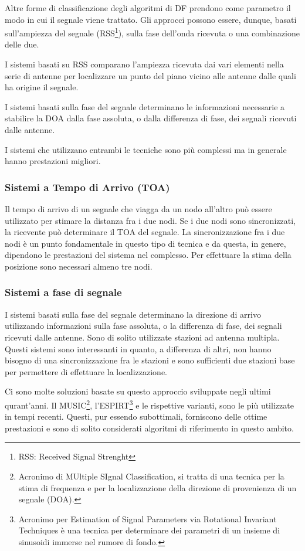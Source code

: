 Altre forme di classificazione degli algoritmi di DF prendono come parametro il modo in cui il segnale viene trattato. Gli approcci possono essere, dunque, basati sull'ampiezza del segnale (RSS\footnote{RSS: Received Signal Strenght}), sulla fase	dell'onda ricevuta o una combinazione delle due. 

I sistemi basati su RSS comparano l'ampiezza ricevuta dai vari elementi nella serie di antenne per localizzare un punto del piano vicino alle antenne dalle quali ha origine il segnale. 

I sistemi basati sulla fase del segnale determinano le informazioni necessarie a stabilire la DOA dalla fase assoluta, o dalla differenza di fase, dei segnali ricevuti dalle antenne. 

I sistemi che utilizzano entrambi le tecniche sono più complessi ma in generale hanno prestazioni migliori.

\subsubsection{Sistemi a Tempo di Arrivo (TOA)}

Il tempo di arrivo di un segnale che viagga da un nodo all'altro può essere utilizzato per stimare la distanza fra i due nodi. Se i due nodi sono sincronizzati, la ricevente può determinare il TOA del segnale. La sincronizzazione fra i due nodi è un punto fondamentale in questo tipo di tecnica e da questa, in genere, dipendono le prestazioni del sistema nel complesso. Per effettuare la stima della posizione sono necessari almeno tre nodi.

\subsubsection{Sistemi a fase di segnale }

I sistemi basati sulla fase del segnale determinano la direzione di arrivo utilizzando informazioni sulla fase assoluta, o la differenza di fase, dei segnali ricevuti dalle antenne. Sono di solito utilizzate stazioni ad antenna multipla. Questi sistemi sono interessanti in quanto, a differenza di altri, non hanno bisogno di una sincronizzazione fra le stazioni e sono sufficienti due stazioni base per permettere	di effettuare la localizzazione. 

Ci sono molte soluzioni basate su questo approccio sviluppate negli ultimi qurant'anni. Il MUSIC\footnote{Acronimo di MUltiple SIgnal Classification, si tratta di una tecnica per la stima di frequenza e per la localizzazione della direzione di provenienza di un segnale (DOA).}, l'ESPIRT\footnote{Acronimo per Estimation of Signal Parameters via Rotational Invariant Techniques è una tecnica per determinare dei parametri di un insieme di sinusoidi immerse nel rumore di fondo.} e le rispettive varianti, sono le più utilizzate in tempi recenti. Questi, pur essendo subottimali, forniscono delle ottime prestazioni e sono di solito considerati algoritmi di riferimento in questo ambito.

